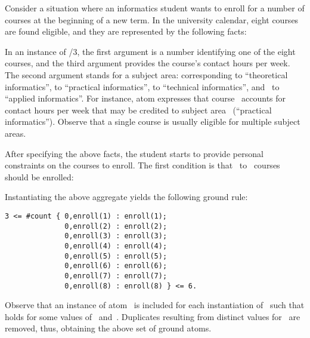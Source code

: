 \begin{example}\label{ex:aggr}
Consider a situation where an informatics student
wants to enroll for a number of courses at the beginning of a new term.
In the university calendar, eight courses are found eligible,
and they are represented by the following facts:
%

%
In an instance of /$3$,
the first argument is a number identifying one of the eight courses,
and the third argument provides the course's contact hours per week.
The second argument stands for a subject area:
 corresponding to ``theoretical informatics'',
               to ``practical informatics'',
               to ``technical informatics'',
and~               to ``applied informatics''.
For instance, atom 
expresses that course~ accounts for~ contact hours per week
that may be credited to subject area~ (``practical informatics'').
Observe that a single course is usually eligible for multiple
subject areas.

After specifying the above facts,
the student starts to provide personal constraints on the courses to enroll.
The first condition is that~ to~ courses should be enrolled:
%

%
Instantiating the above  aggregate
yields the following ground rule:%
%
\begin{lstlisting}[numbers=none]
3 <= #count { 0,enroll(1) : enroll(1);
              0,enroll(2) : enroll(2);
              0,enroll(3) : enroll(3);
              0,enroll(4) : enroll(4);
              0,enroll(5) : enroll(5);
              0,enroll(6) : enroll(6);
              0,enroll(7) : enroll(7);
              0,enroll(8) : enroll(8) } <= 6.
\end{lstlisting}
%
Observe that an instance of atom~ is included for each
instantiation of~ such that 
holds for some values of~ and~.
Duplicates resulting from distinct values for~ are removed, thus,
obtaining the above set of ground atoms.


\end{example}
